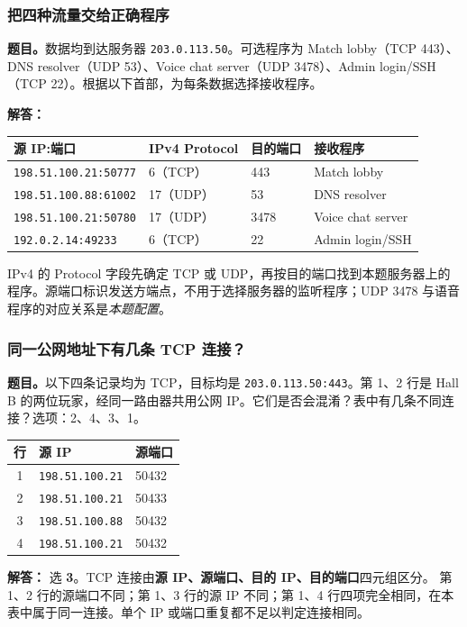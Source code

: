 \documentclass[11pt,a4paper,fontset=fandol]{ctexart}
\renewcommand{\exercisequestion}[2]{%
  \Needspace{5\baselineskip}%
  \subsubsection{#2}\label{exercise:#1}%
}
\renewenvironment{checkedsolution}
  {\par\nopagebreak[4]\textbf{解答：}\ignorespaces}
  {\par}
\begin{document}
\exercisequestion{SC2008-HW04-Q01}{把四种流量交给正确程序}
\textbf{题目。}数据均到达服务器 \texttt{203.0.113.50}。可选程序为 Match lobby（TCP 443）、DNS resolver（UDP 53）、Voice chat server（UDP 3478）、Admin login/SSH（TCP 22）。根据以下首部，为每条数据选择接收程序。
\begin{checkedsolution}
\begin{center}
\small
\begin{tabular}{@{}llll@{}}
\toprule
源 IP:端口 & IPv4 Protocol & 目的端口 & 接收程序 \\
\midrule
\texttt{198.51.100.21:50777} & 6（TCP） & 443 & Match lobby \\
\texttt{198.51.100.88:61002} & 17（UDP） & 53 & DNS resolver \\
\texttt{198.51.100.21:50780} & 17（UDP） & 3478 & Voice chat server \\
\texttt{192.0.2.14:49233} & 6（TCP） & 22 & Admin login/SSH \\
\bottomrule
\end{tabular}
\end{center}
IPv4 的 Protocol 字段先确定 TCP 或 UDP，再按目的端口找到本题服务器上的程序。源端口标识发送方端点，不用于选择服务器的监听程序；UDP 3478 与语音程序的对应关系是\emph{本题配置}。
\end{checkedsolution}

\exercisequestion{SC2008-HW04-Q02}{同一公网地址下有几条 TCP 连接？}
\textbf{题目。}以下四条记录均为 TCP，目标均是 \texttt{203.0.113.50:443}。第 1、2 行是 Hall B 的两位玩家，经同一路由器共用公网 IP。它们是否会混淆？表中有几条不同连接？选项：2、4、3、1。
\begin{center}
\small
\begin{tabular}{@{}cll@{}}
\toprule
行 & 源 IP & 源端口 \\
\midrule
1 & \texttt{198.51.100.21} & 50432 \\
2 & \texttt{198.51.100.21} & 50433 \\
3 & \texttt{198.51.100.88} & 50432 \\
4 & \texttt{198.51.100.21} & 50432 \\
\bottomrule
\end{tabular}
\end{center}
\begin{checkedsolution}
选 \textbf{3}。TCP 连接由\textbf{源 IP、源端口、目的 IP、目的端口}四元组区分。
第 1、2 行的源端口不同；第 1、3 行的源 IP 不同；第 1、4 行四项完全相同，在本表中属于同一连接。单个 IP 或端口重复都不足以判定连接相同。
\end{checkedsolution}
\end{document}

